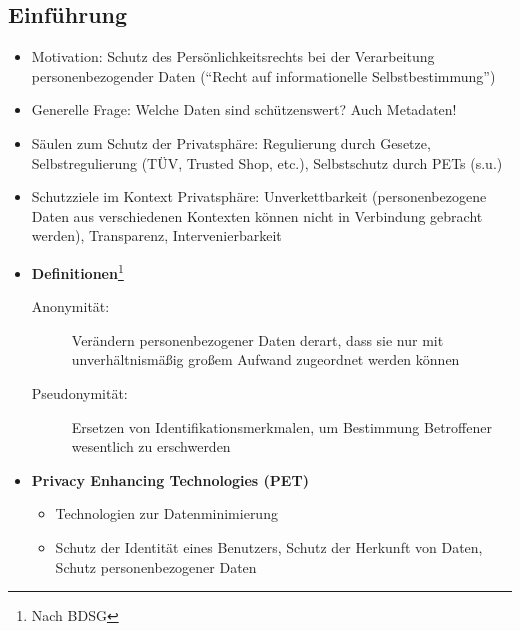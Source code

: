 \subsection{Einführung}
\begin{itemize}
	\item Motivation: Schutz des Persönlichkeitsrechts bei der Verarbeitung personenbezogender Daten ("`Recht auf informationelle Selbstbestimmung"')
	\item Generelle Frage: Welche Daten sind schützenswert? Auch Metadaten!
	\item Säulen zum Schutz der Privatsphäre: Regulierung durch Gesetze, Selbstregulierung (TÜV, Trusted Shop, etc.), Selbstschutz durch PETs (s.u.)
	\item Schutzziele im Kontext Privatsphäre: Unverkettbarkeit (personenbezogene Daten aus verschiedenen Kontexten können nicht in Verbindung gebracht werden), Transparenz, Intervenierbarkeit
	\item \textbf{Definitionen}\footnote{Nach BDSG}
	\begin{description}
		\item[Anonymität:] Verändern personenbezogener Daten derart, dass sie nur mit unverhältnismäßig großem Aufwand zugeordnet werden können
		\item[Pseudonymität:] Ersetzen von Identifikationsmerkmalen, um Bestimmung Betroffener wesentlich zu erschwerden
	\end{description}
	\item \textbf{Privacy Enhancing Technologies (PET)}
	\begin{itemize}
		\item Technologien zur Datenminimierung
		\item Schutz der Identität eines Benutzers, Schutz der Herkunft von Daten, Schutz personenbezogener Daten
	\end{itemize}
\end{itemize}


